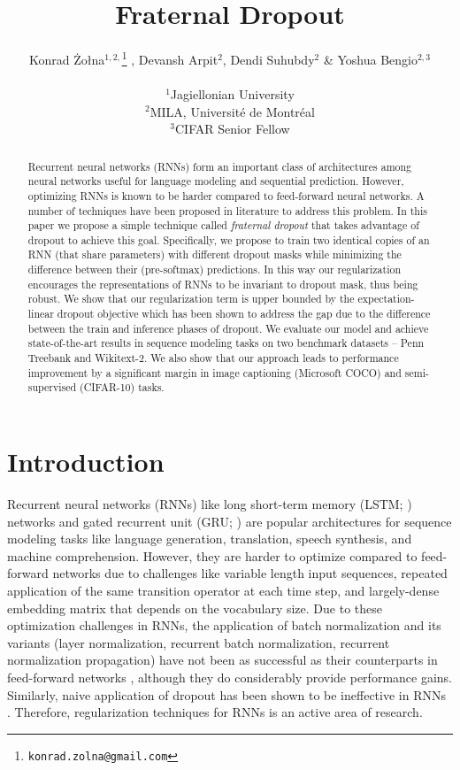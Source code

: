 \documentclass{article} \usepackage{iclr2018_conference,times}
\title{Fraternal Dropout}
\author{
Konrad \.Zo\l{}na$^{1,2,}$\thanks{\texttt{konrad.zolna@gmail.com}}  , Devansh Arpit$^2$, Dendi Suhubdy$^2$ \& Yoshua Bengio$^{2,3}$
\\\\
$^1$Jagiellonian University\\
$^2$MILA, Universit\'e de Montr\'eal\\
$^3$CIFAR Senior Fellow}
\begin{document}
\maketitle

\begin{abstract}
Recurrent neural networks (RNNs) form an important class of architectures among neural networks useful for language modeling and sequential prediction. However, optimizing RNNs is known to be harder compared to feed-forward neural networks. A number of techniques have been proposed in literature to address this problem. In this paper we propose a simple technique called \emph{fraternal dropout} that takes advantage of dropout to achieve this goal. Specifically, we propose to train two identical copies of an RNN (that share parameters) with different dropout masks while minimizing the difference between their (pre-softmax) predictions. In this way our regularization encourages the representations of RNNs to be invariant to dropout mask, thus being robust. We show that our regularization term is upper bounded by the expectation-linear dropout objective which has been shown to address the gap due to the difference between the train and inference phases of dropout. We evaluate our model and achieve state-of-the-art results in sequence modeling tasks on two benchmark datasets -- Penn Treebank and Wikitext-2. We also show that our approach leads to performance improvement by a significant margin in image captioning (Microsoft COCO) and semi-supervised (CIFAR-10) tasks.
\end{abstract}

\section{Introduction}
Recurrent neural networks (RNNs) like long short-term memory (LSTM; \cite{lstm}) networks and gated recurrent unit (GRU; \cite{gru}) are popular architectures for sequence modeling tasks like language generation, translation, speech synthesis, and machine comprehension. However, they are harder to optimize compared to feed-forward networks due to challenges like variable length input sequences, repeated application of the same transition operator at each time step, and largely-dense embedding matrix that depends on the vocabulary size. Due to these optimization challenges in RNNs, the application of batch normalization and its variants (layer normalization, recurrent batch normalization, recurrent normalization propagation) have not been as successful as their counterparts in feed-forward networks \citep{laurent2016batch}, although they do considerably provide performance gains. Similarly, naive application of dropout \citep{srivastava2014dropout} has been shown to be ineffective in RNNs \citep{zaremba2014recurrent}. Therefore, regularization techniques for RNNs is an active area of research.
\end{document}
